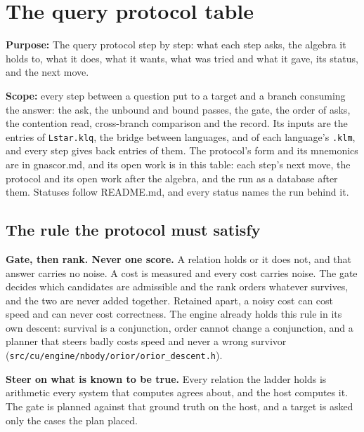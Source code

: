 \chapter{\texorpdfstring{The query protocol table}{The query protocol table}}
\label{chap:query-protocol-table}

\textbf{Purpose:} The query protocol step by step: what each step asks, the algebra it holds to, what it does, what it wants, what was tried and what it gave, its status, and the next move.

\textbf{Scope:} every step between a question put to a target and a branch consuming the answer: the ask, the unbound and bound passes, the gate, the order of asks, the contention read, cross-branch comparison and the record. Its inputs are the entries of \texttt{Lstar.\allowbreak{}klq}, the bridge between languages, and of each language's \texttt{.\allowbreak{}klm}, and every step gives back entries of them. The protocol's form and its mnemonics are in gnascor.md, and its open work is in this table: each step's next move, the protocol and its open work after the algebra, and the run as a database after them. Statuses follow README.md, and every status names the run behind it.

\section{\texorpdfstring{The rule the protocol must satisfy}{The rule the protocol must satisfy}}

\textbf{Gate, then rank. Never one score.} A relation holds or it does not, and that answer carries no noise. A cost is measured and every cost carries noise. The gate decides which candidates are admissible and the rank orders whatever survives, and the two are never added together. Retained apart, a noisy cost can cost speed and can never cost correctness. The engine already holds this rule in its own descent: survival is a conjunction, order cannot change a conjunction, and a planner that steers badly costs speed and never a wrong survivor (\texttt{src/\allowbreak{}cu/\allowbreak{}engine/\allowbreak{}nbody/\allowbreak{}orior/\allowbreak{}orior\_\allowbreak{}descent.\allowbreak{}h}).

\textbf{Steer on what is known to be true.} Every relation the ladder holds is arithmetic every system that computes agrees about, and the host computes it. The gate is planned against that ground truth on the host, and a target is asked only the cases the plan placed.

